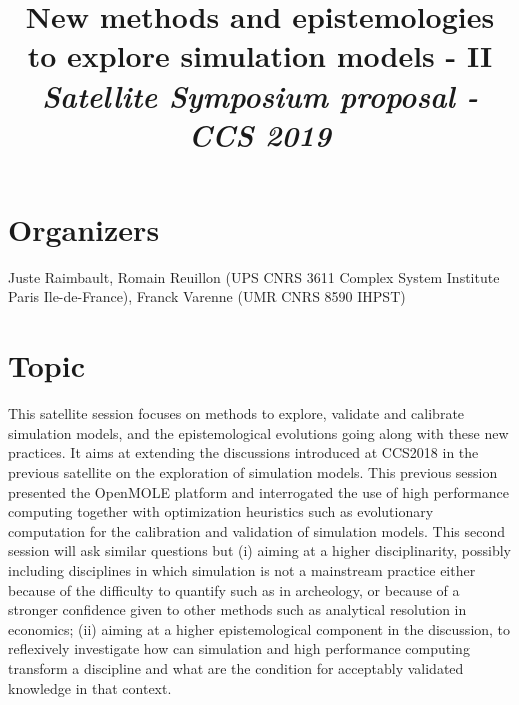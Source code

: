 \documentclass[11pt]{article}
\begin{document}
\title{\vspace{-2cm}New methods and epistemologies to explore simulation models - II
\bigskip\\
\textit{Satellite Symposium proposal - CCS 2019}
}

\date{}

\maketitle

\justify



\section*{Organizers}

Juste Raimbault, Romain Reuillon (UPS CNRS 3611 Complex System Institute Paris Ile-de-France), Franck Varenne (UMR CNRS 8590 IHPST)




\section*{Topic}

This satellite session focuses on methods to explore, validate and calibrate simulation models, and the epistemological evolutions going along with these new practices. It aims at extending the discussions introduced at CCS2018 in the previous satellite on the exploration of simulation models. This previous session presented the OpenMOLE platform and interrogated the use of high performance computing together with optimization heuristics such as evolutionary computation for the calibration and validation of simulation models. This second session will ask similar questions but (i) aiming at a higher disciplinarity, possibly including disciplines in which simulation is not a mainstream practice either because of the difficulty to quantify such as in archeology, or because of a stronger confidence given to other methods such as analytical resolution in economics; (ii) aiming at a higher epistemological component in the discussion, to reflexively investigate how can simulation and high performance computing transform a discipline and what are the condition for acceptably validated knowledge in that context. 
\end{document}
